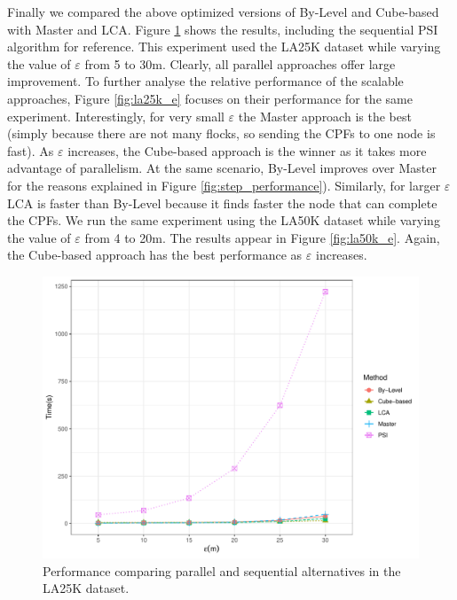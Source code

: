 Finally we compared the above optimized versions of By-Level and Cube-based with Master and LCA. Figure \ref{fig:la25k_e_bfe_psi} shows the results, including the sequential PSI algorithm for reference. This experiment used the LA25K dataset while varying the value of $\varepsilon$ from 5 to 30m. Clearly, all parallel approaches offer large improvement. To further analyse the relative performance of the scalable approaches, Figure \ref{fig:la25k_e} focuses on their performance for the same experiment. Interestingly, for very small $\varepsilon$ the Master approach is the best (simply because there are not many flocks, so sending the CPFs to one node is fast). As $\varepsilon$ increases, the Cube-based approach is the winner as it takes more advantage of parallelism. At the same scenario, By-Level improves over Master for the reasons explained in Figure \ref{fig:step_performance}). Similarly, for larger $\varepsilon$ LCA is faster than By-Level because it finds faster the node that can complete the CPFs.
We run the same experiment using the LA50K dataset while varying the value of $\varepsilon$ from 4 to 20m. The results appear in Figure \ref{fig:la50k_e}. Again, the Cube-based approach has the best performance as $\varepsilon$ increases.

\begin{figure}
    \centering
    \includegraphics[width=0.75\linewidth]{figures/plots/08_sequential_parallel/la25k_e_bfe_psi.pdf}
    \caption{Performance comparing parallel and sequential alternatives in the LA25K dataset.}\label{fig:la25k_e_bfe_psi}
\end{figure}

